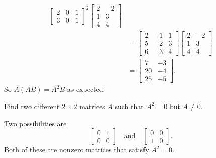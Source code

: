 \begin{solution}
\begin{align*}
\begin{bmatrix}
      2 & 0 & 1 \\
      3 & 0 & 1
    \end{bmatrix}^2
    \begin{bmatrix}
      2 & -2 \\
      1 & 3 \\
      4 & 4
    \end{bmatrix} \\
    &=
    \begin{bmatrix}
      2 & -1 & 1 \\
      5 & -2 & 3 \\
      6 & -3 & 4
    \end{bmatrix}
    \begin{bmatrix}
      2 & -2 \\
      1 & 3 \\
      4 & 4
    \end{bmatrix} \\
    &=
    \begin{bmatrix}
      7 & -3 \\
      20 & -4 \\
      25 & -5
    \end{bmatrix}.
  \end{align*}
  So $A(AB) = A^2B$ as expected.
\end{solution}

 Find two different $2\times2$ matrices $A$ such that
$A^2 = 0$ but $A\neq0$.
\begin{solution}
  Two possibilities are
  \begin{equation*}
    \begin{bmatrix}
      0 & 1 \\
      0 & 0
    \end{bmatrix}
    \quad\text{and}\quad
    \begin{bmatrix}
      0 & 0 \\
      1 & 0
    \end{bmatrix}.
  \end{equation*}
  Both of these are nonzero matrices that satisfy $A^2 = 0$.
\end{solution}
